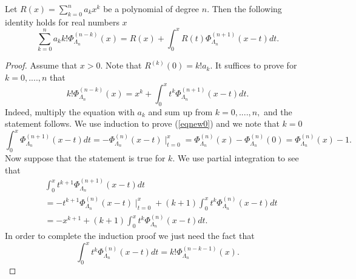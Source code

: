 \documentclass[10pt,a4paper]{amsart}
\begin{document}
\begin{theorem}
\label{ThmMain0}Let $R\left(  x\right)  =%
{\displaystyle\sum_{k=0}^{n}}
a_{k}x^{k}$ be a polynomial of degree $n.$ Then the following identity holds
for real numbers $x$
\[%
{\displaystyle\sum_{k=0}^{n}}
a_{k}k!\Phi_{\Lambda_{n}}^{\left(  n-k\right)  }\left(  x\right)  =R\left(
x\right)  +\int_{0}^{x}R\left(  t\right)  \Phi_{\Lambda_{n}}^{\left(
n+1\right)  }\left(  x-t\right)  dt.
\]

\end{theorem}

\begin{proof}
Assume that $x>0.$ Note that $R^{\left(  k\right)  }\left(  0\right)
=k!a_{k}.$ It suffices to prove for $k=0,....,n$ that%
\begin{equation}
k!\Phi_{\Lambda_{n}}^{\left(  n-k\right)  }\left(  x\right)  =x^{k}+\int
_{0}^{x}t^{k}\Phi_{\Lambda_{n}}^{\left(  n+1\right)  }\left(  x-t\right)  dt.
\label{eqnew0}%
\end{equation}
Indeed, multiply the equation with $a_{k}$ and sum up from $k=0,....,n,$ and
the statement follows. We use induction to prove (\ref{eqnew0}) and we note
that $k=0$
\[
\int_{0}^{x}\Phi_{\Lambda_{n}}^{\left(  n+1\right)  }\left(  x-t\right)
dt=-\Phi_{\Lambda_{n}}^{\left(  n\right)  }\left(  x-t\right)  \mid_{t=0}%
^{x}=\Phi_{\Lambda_{n}}^{\left(  n\right)  }\left(  x\right)  -\Phi
_{\Lambda_{n}}^{\left(  n\right)  }\left(  0\right)  =\Phi_{\Lambda_{n}%
}^{\left(  n\right)  }\left(  x\right)  -1.
\]
Now suppose that the statement is true for $k.$ We use partial integration to
see that
\begin{align*}
&  \int_{0}^{x}t^{k+1}\Phi_{\Lambda_{n}}^{\left(  n+1\right)  }\left(
x-t\right)  dt\\
&  =-t^{k+1}\Phi_{\Lambda_{n}}^{\left(  n\right)  }\left(  x-t\right)
\mid_{t=0}^{x}+\left(  k+1\right)  \int_{0}^{x}t^{k}\Phi_{\Lambda_{n}%
}^{\left(  n\right)  }\left(  x-t\right)  dt\\
&  =-x^{k+1}+\left(  k+1\right)  \int_{0}^{x}t^{k}\Phi_{\Lambda_{n}}^{\left(
n\right)  }\left(  x-t\right)  dt.
\end{align*}
In order to complete the induction proof we just need the fact that
\begin{equation}
\int_{0}^{x}t^{k}\Phi_{\Lambda_{n}}^{\left(  n\right)  }\left(  x-t\right)
dt=k!\Phi_{\Lambda_{n}}^{\left(  n-k-1\right)  }\left(  x\right)  .
\label{eqNew}%

\end{equation}
\end{proof}
\end{document}
